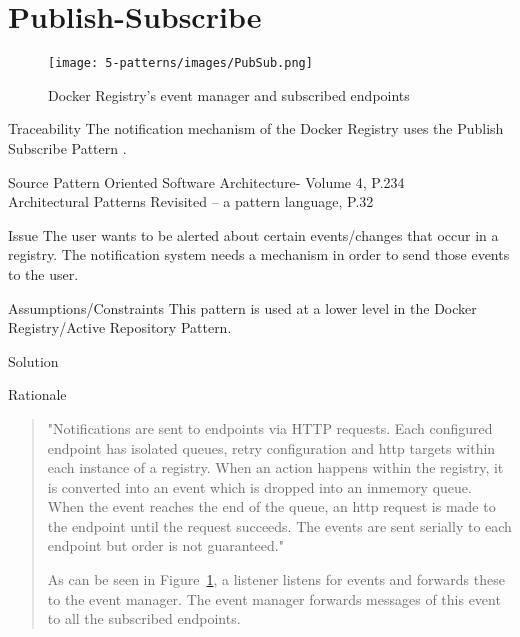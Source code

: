 \section{Publish-Subscribe}
\begin{figure}[H]
\centering
\texttt{[image: 5-patterns/images/PubSub.png]}
\caption{Docker Registry's event manager and subscribed endpoints}
\label{fig:publish-subscribe}
\end{figure}
\begin{patdescription}

\item[Traceability]
The notification mechanism of the Docker Registry uses the Publish Subscribe Pattern \cite{docknotif}.

\item[Source]
Pattern Oriented Software Architecture- Volume 4, P.234 \cite{wiley4} \\
Architectural Patterns Revisited -- a pattern language, P.32
\cite{avgeriou2005architectural}

\item[Issue] The user wants to be alerted about certain events/changes that occur in a registry.
The notification system needs a mechanism in order to send those events to the user.

\item[Assumptions/Constraints] 
This pattern is used at a lower level in the Docker Registry/Active Repository Pattern.



\item[Solution]

\item[Rationale] 


\begin{quote}
"Notifications are sent to endpoints via HTTP requests. Each configured endpoint has isolated queues, retry configuration and http targets within each instance of a registry. When an action happens within the registry, it is converted into an event which is dropped into an inmemory queue. When the event reaches the end of the queue, an http request is made to the endpoint until the request succeeds. The events are sent serially to each endpoint but order is not guaranteed."%

As can be seen in Figure~\ref{fig:publish-subscribe}, a listener listens for events and forwards these to the event manager. The event manager forwards messages of this event to all the subscribed endpoints.
\end{quote} 


\end{patdescription}
